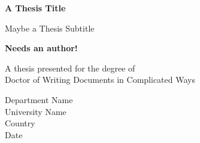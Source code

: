 \begin{titlepage}
\centering

\vspace*{1cm}

\Huge
\textbf{A Thesis Title}

\vspace{0.5cm}
\LARGE
Maybe a Thesis Subtitle

\large

\vspace{1.5cm}

\textbf{Needs an author!}

\vfill
    
A thesis presented for the degree of\\
Doctor of Writing Documents in Complicated Ways
    
\vspace{0.8cm}

    
Department Name\\
University Name\\
Country\\
Date
    
\end{titlepage}
